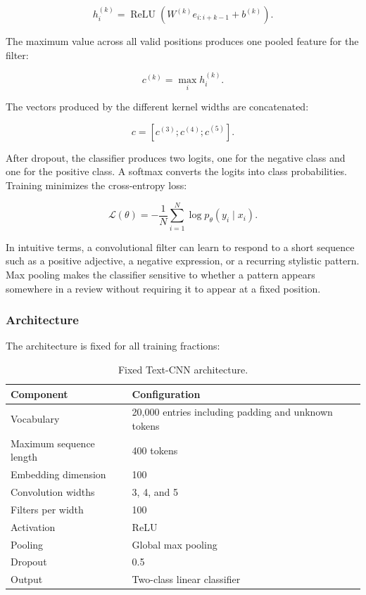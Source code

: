 \documentclass[11pt]{article}
\begin{document}
\begin{equation}
h_i^{(k)} = \operatorname{ReLU}\left(W^{(k)} e_{i:i+k-1} + b^{(k)}\right).
\end{equation}

The maximum value across all valid positions produces one pooled feature for the filter:

\begin{equation}
c^{(k)} = \max_i h_i^{(k)}.
\end{equation}

The vectors produced by the different kernel widths are concatenated:

\begin{equation}
c = [c^{(3)}; c^{(4)}; c^{(5)}].
\end{equation}

After dropout, the classifier produces two logits, one for the negative class and one for the positive class. A softmax converts the logits into class probabilities. Training minimizes the cross-entropy loss:

\begin{equation}
\mathcal{L}(\theta) = -\frac{1}{N}\sum_{i=1}^{N}\log p_{\theta}(y_i \mid x_i).
\end{equation}

In intuitive terms, a convolutional filter can learn to respond to a short sequence such as a positive adjective, a negative expression, or a recurring stylistic pattern. Max pooling makes the classifier sensitive to whether a pattern appears somewhere in a review without requiring it to appear at a fixed position.

\subsubsection{Architecture}

The architecture is fixed for all training fractions:

\begin{table}[htbp]
\centering
\caption{Fixed Text-CNN architecture.}
\label{tab:architecture}
\begin{tabular}{ll}
\toprule
Component & Configuration \\
\midrule
Vocabulary & 20,000 entries including padding and unknown tokens \\
Maximum sequence length & 400 tokens \\
Embedding dimension & 100 \\
Convolution widths & 3, 4, and 5 \\
Filters per width & 100 \\
Activation & ReLU \\
Pooling & Global max pooling \\
Dropout & 0.5 \\
Output & Two-class linear classifier \\
\bottomrule
\end{tabular}
\end{table}
\end{document}
